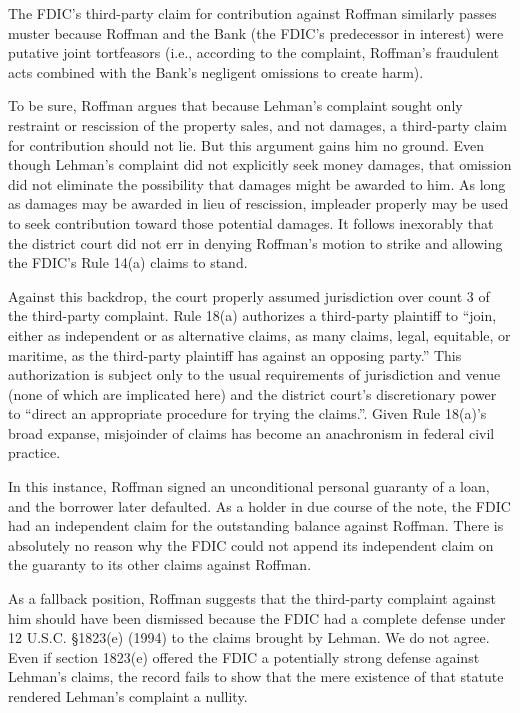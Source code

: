 \documentclass[11pt,letterpaper,twoside]{article}
\begin{document}
The FDIC's third-party claim for contribution against Roffman similarly
passes muster because Roffman and the Bank (the FDIC's predecessor in
interest) were putative joint tortfeasors (i.e., according to the
complaint, Roffman's fraudulent acts combined with the Bank's negligent
omissions to create harm).

To be sure, Roffman argues that because Lehman's complaint sought only
restraint or rescission of the property sales, and not damages, a
third-party claim for contribution should not lie. But this argument
gains him no ground. Even though Lehman's complaint did not explicitly
seek money damages, that omission did not eliminate the possibility that
damages might be awarded to him. As long as damages may be awarded in
lieu of rescission, impleader properly may be used to seek contribution
toward those potential damages. It follows inexorably that the district
court did not err in denying Roffman's motion to strike and allowing the
FDIC's Rule 14(a) claims to stand.

Against this backdrop, the court properly assumed jurisdiction over
count 3 of the third-party complaint. Rule 18(a) authorizes a
third-party plaintiff to ``join, either as independent or as alternative
claims, as many claims, legal, equitable, or maritime, as the
third-party plaintiff has against an opposing party.'' This
authorization is subject only to the usual requirements of jurisdiction
and venue (none of which are implicated here) and the district court's
discretionary power to ``direct an appropriate procedure for trying the
claims.''. Given Rule 18(a)'s broad expanse, misjoinder of claims has
become an anachronism in federal civil practice.

In this instance, Roffman signed an unconditional personal guaranty of a
loan, and the borrower later defaulted. As a holder in due course of the
note, the FDIC had an independent claim for the outstanding balance
against Roffman. There is absolutely no reason why the FDIC could not
append its independent claim on the guaranty to its other claims against
Roffman.

As a fallback position, Roffman suggests that the third-party complaint
against him should have been dismissed because the FDIC had a complete
defense under 12 U.S.C. §1823(e) (1994) to the claims brought by Lehman.
We do not agree. Even if section 1823(e) offered the FDIC a potentially
strong defense against Lehman's claims, the record fails to show that
the mere existence of that statute rendered Lehman's complaint a
nullity.
\end{document}
